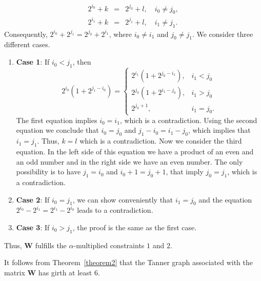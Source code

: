 \documentclass[journal,draftclsnofoot,onecolumn,12pt,twoside]{IEEEtran}
\begin{document}
\begin{IEEEproof}
\begin{eqnarray*}
  2^{i_0}+k &=& 2^{j_0}+l,\quad i_0\neq j_0, \\
  2^{i_1}+k &=& 2^{j_1}+l,\quad i_1\neq j_1.
\end{eqnarray*}
Consequently, $2^{i_0}+2^{j_1}=2^{j_0}+2^{i_1}$, where $i_0\neq i_1$ and $j_0\neq j_1$. We consider three different cases.
\setdefaultleftmargin{0cm}{2cm}{}{}{}{}
\begin{enumerate}[]
\item{\textbf{Case 1}:} If $i_0<j_1$, then
  $$2^{i_0}(1+2^{j_1-i_0})=\left\{ \begin{array}{ll}
    2^{i_1}(1+2^{j_0-i_1}), & i_1<j_0 \\
    2^{j_0}(1+2^{i_1-j_0}), & i_1>j_0 \\
    2^{j_0+1}, & i_1=j_0.
  \end{array}\right.$$
  The first equation implies $i_0=i_1$, which is a contradiction. Using the second equation we conclude that $i_0=j_0$ and $j_1-i_0=i_1-j_0$, which implies that $i_1=j_1$. Thus, $k=l$ which is a contradiction. Now we consider the third equation. In the left side of this equation we have a product of an even and an odd number and in the right side we have an even number. The only possibility is to have $j_1=i_0$ and $i_0+1=j_0+1$, that imply $j_0=j_1$, which is a contradiction.
\item{\textbf{Case 2}:} If $i_0=j_1$, we can show conveniently that $i_1=j_0$ and the equation $2^{i_0}-2^{i_1}=2^{i_1}-2^{i_0}$ leads to a contradiction.
\item{\textbf{Case 3}:} If $i_0>j_1$, the proof is the same as the first case.
\end{enumerate}
Thus, $\mathbf{W}$ fulfills the $\alpha$-multiplied constraints $1$ and $2$.
\end{IEEEproof}


It follows from Theorem~\ref{theorem2} that the Tanner graph associated with the matrix $\mathbf{W}$ has girth at least $6$.
\end{document}
